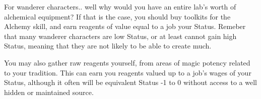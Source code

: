 \begin{multicols*}{2}
	For wanderer characters.. well why would you have an entire lab's worth of alchemical equipment? If that is the case, you should buy toolkits for the Alchemy skill, and earn reagents of value equal to a job your Status. Remeber that many wanderer characters are low Status, or at least cannot gain high Status, meaning that they are not likely to be able to create much.
	
	You may also gather raw reagents yourself, from areas of magic potency related to your tradition. This can earn you reagents valued up to a job's wages of your Status, although it often will be equivalent Status -1 to 0 without access to a well hidden or maintained source.
	
\end{multicols*}